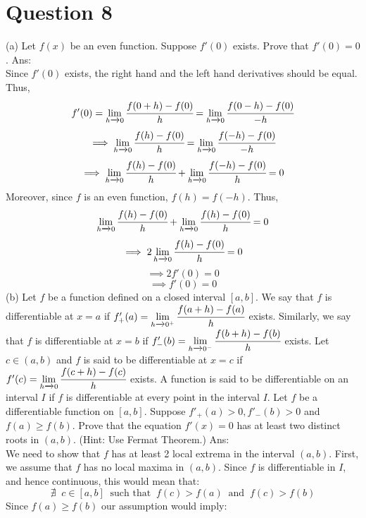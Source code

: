 \documentclass{article}
\begin{document}
\section*{Question 8}
(a) Let $f(x)$ be an even function. Suppose $f'(0)$ exists. Prove that $f'(0) = 0$.  
\newline
\newline
Ans:
\\ Since $f'(0)$ exists, the right hand and the left hand derivatives should be equal. Thus,
$$f'(0) = \lim_{h \xrightarrow{} 0} \cfrac{f(0 + h) - f(0)}{h} = \lim_{h \xrightarrow{} 0} \cfrac{f(0 - h) - f(0)}{-h} $$
$$ \implies \lim_{h \xrightarrow{} 0} \cfrac{f(h) - f(0)}{h} = \lim_{h \xrightarrow{} 0} \cfrac{f(-h) - f(0)}{-h} $$
$$ \implies \lim_{h \xrightarrow{} 0} \cfrac{f(h) - f(0)}{h} + \lim_{h \xrightarrow{} 0} \cfrac{f(-h) - f(0)}{h} = 0$$
Moreover, since $f$ is an even function, $f(h) = f(-h)$. Thus, 
$$ \lim_{h \xrightarrow{} 0} \cfrac{f(h) - f(0)}{h} + \lim_{h \xrightarrow{} 0} \cfrac{f(h) - f(0)}{h} = 0$$
$$ \implies 2\lim_{h \xrightarrow{} 0} \cfrac{f(h) - f(0)}{h} = 0$$
$$ \implies 2f'(0) = 0$$
$$ \implies f'(0) = 0$$
\newline
\newline
(b) Let $f$ be a function defined on a closed interval $[a, b]$. We say that $f$ is differentiable at $x = a$ if 
$f'_{+}(a) = \displaystyle\lim_{h \xrightarrow{} 0^{+}} \cfrac{f(a + h) - f(a)}{h}$ exists. Similarly, we say that $f$ is differentiable at $x = b$ if
$f'_{-}(b) = \displaystyle\lim_{h \xrightarrow{} 0^{-}} \cfrac{f(b + h) - f(b)}{h}$ exists. Let $c \in (a, b)$ and $f$ is said to be differentiable at $x = c$ if 
$f'(c) = \displaystyle\lim_{h \xrightarrow{} 0} \cfrac{f(c + h) - f(c)}{h}$ exists. A function is said to be differentiable on an interval $I$ if $f$ is differentiable at every point in the interval $I$. Let $f$ be a differentiable function on $[a, b]$. Suppose $f'_{+}(a) > 0, f'_{-}(b) > 0$ and $f(a) \geq f(b)$. Prove that the equation $f'(x) = 0$ has at least two distinct roots in $(a, b)$.  
(Hint: Use Fermat Theorem.)
\newline
\newline
Ans:
\\ We need to show that $f$ has at least 2 local extrema in the interval $(a, b)$. First, we assume that $f$ has no local maxima in $(a, b)$. Since $f$ is differentiable in $I$, and hence continuous, this would mean that:
$$\nexists \;\; c \in [a, b] \;\; \text{such that} \;\; f(c) > f(a) \;\; \text{and} \;\; f(c)>f(b)$$
Since $f(a) \geq f(b)$ our assumption would imply:
\end{document}
